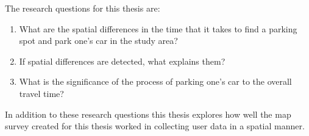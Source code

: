 \bigskip
\noindent
The research questions for this thesis are:

\begin{spacing}{1}
\begin{enumerate}[label=\Roman*] %
  \item What are the spatial differences in the time that it takes to find a parking spot and park one’s car in the study area?
  \item If spatial differences are detected, what explains them?
  \item What is the significance of the process of parking one’s car to the overall travel time?
\end{enumerate}
\end{spacing}
\bigskip
In addition to these research questions this thesis explores how well the map survey created for this thesis worked in collecting user data in a spatial manner.